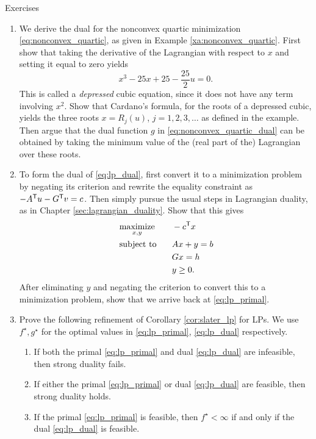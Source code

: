 \begin{xcb}{Exercises}
\begin{enumerate}[label=\thechapter.\arabic*]
\item \label{ex:nonconvex_quartic}
  We derive the dual for the nonconvex quartic minimization
  \eqref{eq:nonconvex_quartic}, as given in Example
  \ref{xa:nonconvex_quartic}. First show that taking the derivative of the  
  Lagrangian with respect to $x$ and setting it equal to zero yields 
  \[
  x^3 - 25x + 25 - \frac{25}{2} u = 0.
  \]
  This is called a \emph{depressed} cubic equation, since it does not have any 
  term involving $x^2$. Show that Cardano's formula, for the roots of a
  depressed cubic, yields the three roots $x = R_j(u)$, $j = 1,2,3,\dots$ as
  defined in the example. Then argue that the dual function $g$ in 
  \eqref{eq:nonconvex_quartic_dual} can be obtained by taking the minimum value
  of the (real part of the) Lagrangian over these roots. 

\item \label{ex:lp_dual_dual}
  To form the dual of \eqref{eq:lp_dual}, first convert it to a minimization
  problem by negating its criterion and rewrite the equality constraint as
  $-A^{\mathsf{T}} u - G^{\mathsf{T}} v = c$. Then simply pursue the usual steps in Lagrangian
  duality, as in Chapter \ref{sec:lagrangian_duality}. Show that this gives       
  \begin{alignat*}{2}
  &\operatorname*{maximize}_{x,y} \quad && -c^{\mathsf{T}} x \\ 
  &\operatorname{subject\,\,to} &&  Ax + y = b \\
  & && Gx = h \\
  & && y \geq 0.
  \end{alignat*}
  After eliminating $y$ and negating the criterion to convert this to a
  minimization problem, show that we arrive back at \eqref{eq:lp_primal}.  

\item \label{ex:lp_slater}
  Prove the following refinement of Corollary \ref{cor:slater_lp} for LPs. We
  use $f^\star, g^\star$ for the optimal values in \eqref{eq:lp_primal},
  \eqref{eq:lp_dual} respectively. 

\begin{enumerate}[label=\alph*.]
\item If both the primal \eqref{eq:lp_primal} and dual \eqref{eq:lp_dual} are
  infeasible, then strong duality fails.

\item If either the primal \eqref{eq:lp_primal} or dual \eqref{eq:lp_dual} are
  feasible, then strong duality holds.

\item If the primal \eqref{eq:lp_primal} is feasible, then $f^\star < \infty$ 
  if and only if the dual \eqref{eq:lp_dual} is feasible.   


\end{enumerate}
\end{enumerate}
\end{xcb}
